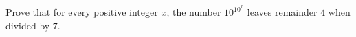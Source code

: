 Prove that for every positive integer $x$, the number $10^{10^x}$ leaves remainder $4$ when divided by $7$.
